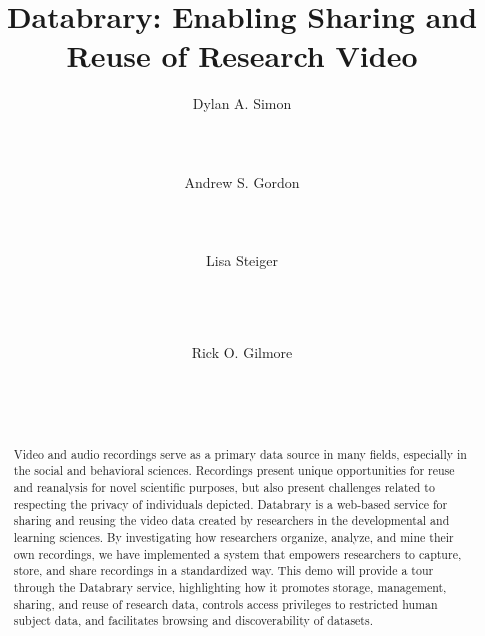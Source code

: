 \documentclass{sig-alternate-2013}
\begin{document}

\title{Databrary: Enabling Sharing and Reuse of Research Video}


\author{
\alignauthor
Dylan A. Simon\\
	\\
	\\
	\\
\alignauthor
Andrew S. Gordon\\
	\\
	\\
	\\
\alignauthor
Lisa Steiger\\
	\\
	\\
	\\
\and
Rick O. Gilmore\\
	\\
	\\
	\\
}

\maketitle

\begin{abstract}
Video and audio recordings serve as a primary data source in many fields, especially in the social and behavioral sciences.
Recordings present unique opportunities for reuse and reanalysis for novel scientific purposes, but also present challenges related to respecting the privacy of individuals depicted.
Databrary is a web-based service for sharing and reusing the video data created by researchers in the developmental and learning sciences.
By investigating how researchers organize, analyze, and mine their own recordings, we have implemented a system that empowers researchers to capture, store, and share recordings in a standardized way.
This demo will provide a tour through the Databrary service, highlighting how it promotes storage, management, sharing, and reuse of research data, controls access privileges to restricted human subject data, and facilitates browsing and discoverability of datasets.
\end{abstract}
\end{document}
